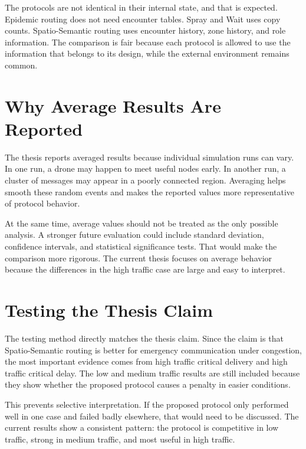 The protocols are not identical in their internal state, and that is expected. Epidemic routing does not need encounter tables. Spray and Wait uses copy counts. Spatio-Semantic routing uses encounter history, zone history, and role information. The comparison is fair because each protocol is allowed to use the information that belongs to its design, while the external environment remains common.

\section{Why Average Results Are Reported}
The thesis reports averaged results because individual simulation runs can vary. In one run, a drone may happen to meet useful nodes early. In another run, a cluster of messages may appear in a poorly connected region. Averaging helps smooth these random events and makes the reported values more representative of protocol behavior.

At the same time, average values should not be treated as the only possible analysis. A stronger future evaluation could include standard deviation, confidence intervals, and statistical significance tests. That would make the comparison more rigorous. The current thesis focuses on average behavior because the differences in the high traffic case are large and easy to interpret.

\section{Testing the Thesis Claim}
The testing method directly matches the thesis claim. Since the claim is that Spatio-Semantic routing is better for emergency communication under congestion, the most important evidence comes from high traffic critical delivery and high traffic critical delay. The low and medium traffic results are still included because they show whether the proposed protocol causes a penalty in easier conditions.

This prevents selective interpretation. If the proposed protocol only performed well in one case and failed badly elsewhere, that would need to be discussed. The current results show a consistent pattern: the protocol is competitive in low traffic, strong in medium traffic, and most useful in high traffic.
